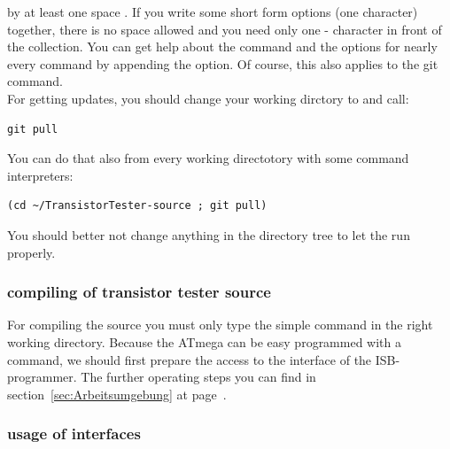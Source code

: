 by at least one space \keys{\space}.
If you write some short form options (one character) together, there is no space allowed
and you need only one - character in front of the collection.
You can get help about the command and the options for nearly every command by appending
the  option.
Of course, this also applies to the git command.\\
For getting updates, you should change your working dirctory to  and call:
\begin{large} \vspace{-0.4em} \begin{verbatim}
git pull
\end{verbatim} \end{large}
You can do that also from every working directotory with some command interpreters:
\begin{large} \vspace{-0.4em} \begin{verbatim}
(cd ~/TransistorTester-source ; git pull)
\end{verbatim} \end{large}
You should better not change anything in the 
directory tree to let the  run properly.


\subsubsection{compiling of transistor tester source}
For compiling the source you must only type the simple command 
in the right working directory.
Because the ATmega can be easy programmed with a  command,
we should first prepare the access to the interface of the ISB-programmer.
The further operating steps you can find in section~\ref{sec:Arbeitsumgebung}
at page~\pageref{sec:Arbeitsumgebung}.

\subsubsection{usage of interfaces}
\label{sec:Schnittstellen}

